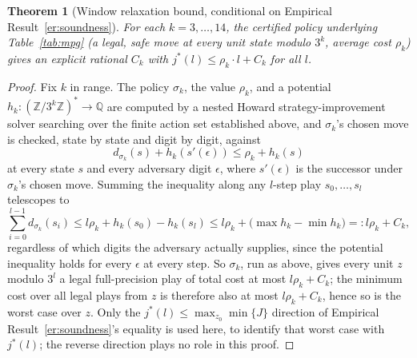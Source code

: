 \documentclass[11pt]{amsart}
\theoremstyle{plain}
\newtheorem{theorem}{Theorem}
\theoremstyle{definition}
\theoremstyle{remark}
\newcommand{\Z}{\mathbb{Z}}
\newcommand{\Q}{\mathbb{Q}}
\begin{document}
\begin{theorem}[Window relaxation bound, conditional on Empirical Result~\ref{er:soundness}]
\label{thm:mpg}
For each $k=3,\dots,14$, the certified policy underlying Table~\ref{tab:mpg} (a legal, safe move at
every unit state modulo $3^k$, average cost $\rho_k$) gives an explicit rational $C_k$ with
$j^*(l) \le \rho_k\cdot l + C_k$ for all $l$.
\end{theorem}

\begin{proof}
Fix $k$ in range. The policy $\sigma_k$, the value $\rho_k$, and a potential $h_k:(\Z/3^k\Z)^*\to\Q$
are computed by a nested Howard strategy-improvement solver searching over the finite action set
established above, and $\sigma_k$'s chosen move is checked, state by state and digit by digit,
against
\[
d_{\sigma_k}(s) + h_k(s'(\epsilon)) \le \rho_k + h_k(s)
\]
at every state $s$ and every adversary digit $\epsilon$, where $s'(\epsilon)$ is the successor under
$\sigma_k$'s chosen move. Summing the inequality along any $l$-step play $s_0,\dots,s_l$ telescopes to
\[
\sum_{i=0}^{l-1} d_{\sigma_k}(s_i) \le l\rho_k + h_k(s_0) - h_k(s_l) \le l\rho_k + \bigl(\max h_k -
\min h_k\bigr) =: l\rho_k + C_k,
\]
regardless of which digits the adversary actually supplies, since the potential inequality holds for
every $\epsilon$ at every step. So $\sigma_k$, run as above, gives every unit $z$ modulo $3^l$ a
legal full-precision play of total cost at most $l\rho_k+C_k$; the minimum cost over all legal plays
from $z$ is therefore also at most $l\rho_k+C_k$, hence so is the worst case over $z$. Only the
$j^*(l)\le\max_{z_0}\min\{J\}$ direction of Empirical Result~\ref{er:soundness}'s equality is used
here, to identify that worst case with $j^*(l)$; the reverse direction plays no role in this proof.
\end{proof}
\end{document}
